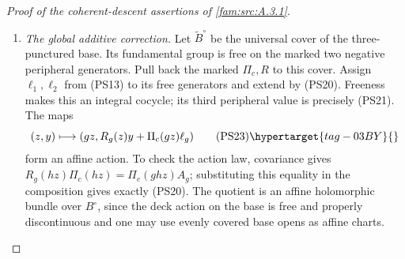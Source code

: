 \begin{proof}[Proof of the coherent-descent assertions of \cref{fam:src:A.3.1}]
\begin{enumerate}[label=\arabic*.,leftmargin=*]
The affine cocycle convention in (PS16) has multiplication law
\[
                    \ell_{gh}=\ell_g+A_g\ell_h.
 \tag{PS20}\hypertarget{tag-03C0}{}\label{wb:pshift:eq:cocycle-law}
\]
Since $g_0=(g_1g_2)^{-1}$, it gives
\[
\begin{aligned}
 \ell_1+A_1\ell_2
   &=-\frac{3n}{2}\widehat w+\frac n2\widehat\delta,\\
 \ell_0=-A_{g_0}(\ell_1+A_1\ell_2)
   &=\frac{3n}{2}\widehat w-\frac n2\widehat\delta.
\end{aligned}
\tag{PS21}\hypertarget{tag-03C4}{}\label{wb:pshift:eq:cusp-cocycle}
\]
Here $A_{g_0}$ fixes both toric lattice vectors, as is also immediate
from $A_{g_0}=\left(\begin{smallmatrix}I&0\\B_0&I\end{smallmatrix}\right)$.
Put
\[
 q_n=(-3n/2,n/2)^{\mathsf t}\in\mathbb Z^2,
                  \qquad a_0(z)=s(z)q_n.
 \tag{PS22}\hypertarget{tag-03C6}{}\label{wb:pshift:eq:cusp-translation}
\]
Then $a_0(g_0z)-a_0(z)=-q_n=\Pi_c(g_0z)\ell_0$, exactly as
required by (PS16). Exponentiating gives the map
$(x,t_c)\mapsto(t_c^{q_n}x,t_c)$ on the dense cusp torus.
It extends holomorphically and invertibly to the marked infinite fan:
the integral map
\[
 (y,y_3)\longmapsto(y+y_3q_n,y_3)
\]
translates each height-one triangle by the integer vector $q_n$ and
therefore permutes the cones, with inverse given by $-q_n$.
It commutes with the cusp quotient action in (PS19). This proves extension across every cusp stratum.
\item \emph{The global additive correction.}
Let $\widetilde B^\circ$ be
the universal cover of the three-punctured base. Its fundamental group
is free on the marked two negative peripheral generators. Pull back
the marked $\Pi_c,R$ to this cover. Assign $\ell_1,\ell_2$ from
(PS13) to its free generators and extend by (PS20). Freeness makes
this an integral cocycle; its third peripheral value is
precisely (PS21). The maps
\[
 (z,y)\longmapsto
       (gz,R_g(z)y+\Pi_c(gz)\ell_g)
 \tag{PS23}\hypertarget{tag-03BY}{}\label{wb:pshift:eq:affine-bundle-action}
\]
form an affine action. To check the action law, covariance gives
$R_g(hz)\Pi_c(hz)=\Pi_c(ghz)A_g$; substituting this equality
in the composition gives exactly (PS20).
The quotient is an affine holomorphic bundle over $B^\circ$, since
the deck action on the base is free and properly discontinuous and
one may use evenly covered base opens as affine charts.


\end{enumerate}
\end{proof}
